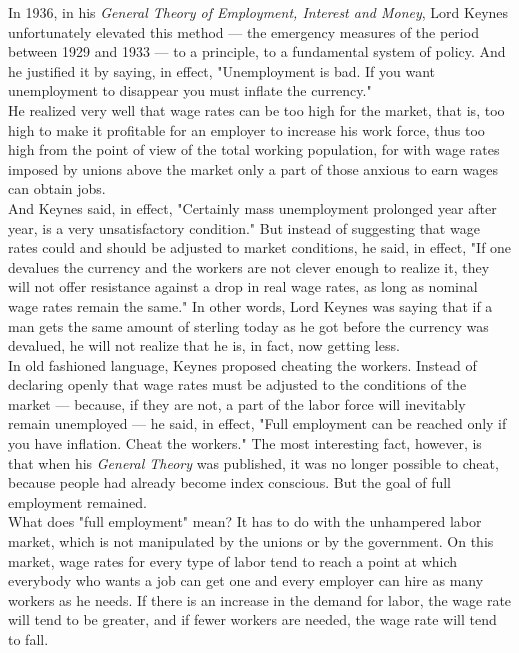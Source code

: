 \documentclass[a4paper]{article}
\begin{document}
In 1936, in his \emph{General Theory of Employment, Interest and Money}, Lord Keynes 
unfortunately elevated this method — the emergency measures of the period 
between 1929 and 1933 — to a principle, to a fundamental system of policy. And 
he justified it by saying, in effect, "Unemployment is bad. If you want 
unemployment to disappear you must inflate the currency."\\

He realized very well that wage rates can be too high for the market, that is, 
too high to make it profitable for an employer to increase his work force, thus
too high from the point of view of the total working population, for with wage 
rates imposed by unions above the market only a part of those anxious to earn 
wages can obtain jobs.\\

And Keynes said, in effect, "Certainly mass unemployment prolonged year after 
year, is a very unsatisfactory condition." But instead of suggesting that wage 
rates could and should be adjusted to market conditions, he said, in effect, 
"If one devalues the currency and the workers are not clever enough to realize 
it, they will not offer resistance against a drop in real wage rates, as long 
as nominal wage rates remain the same." In other words, Lord Keynes was saying 
that if a man gets the same amount of sterling today as he got before the 
currency was devalued, he will not realize that he is, in fact, now getting 
less.\\

In old fashioned language, Keynes proposed cheating the workers. Instead of 
declaring openly that wage rates must be adjusted to the conditions of the 
market — because, if they are not, a part of the labor force will inevitably 
remain unemployed — he said, in effect, "Full employment can be reached only if
you have inflation. Cheat the workers." The most interesting fact, however, is 
that when his \emph{General Theory} was published, it was no longer possible to cheat,
because people had already become index conscious. But the goal of full 
employment remained.\\

What does "full employment" mean? It has to do with the unhampered labor 
market, which is not manipulated by the unions or by the government. On this 
market, wage rates for every type of labor tend to reach a point at which 
everybody who wants a job can get one and every employer can hire as many 
workers as he needs. If there is an increase in the demand for labor, the wage 
rate will tend to be greater, and if fewer workers are needed, the wage rate 
will tend to fall.\\
\end{document}
